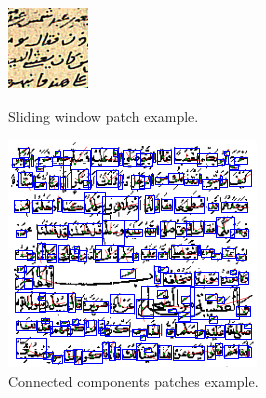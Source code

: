 \documentclass[a4paper,conference]{IEEEtran}
\begin{document}
\begin{figure}[!t]
\centering
\begin{minipage}{.45\linewidth}
	\centering
  \includegraphics[height=.7\linewidth]{figures/3.png}
  \caption{Sliding window patch example.}
  \label{fig:patches_example_sliding_window}
\end{minipage}
\hspace{.05\linewidth}
\begin{minipage}{.45\linewidth}
	\centering
  \includegraphics[height=.7\linewidth]{figures/patches_example_connected_components_part.png}
  \caption{Connected components patches example.}
  \label{fig:patches_example_connected_components}
\end{minipage}
\end{figure}

\end{document}
